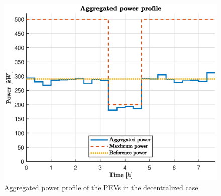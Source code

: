 \begin{figure}[H]
    \centering
    \includegraphics[width=\columnwidth]{figures/images/dec_power.eps}
    \caption{Aggregated power profile of the PEVs in the decentralized case.}
    \label{fig:dec_power}
\end{figure}
